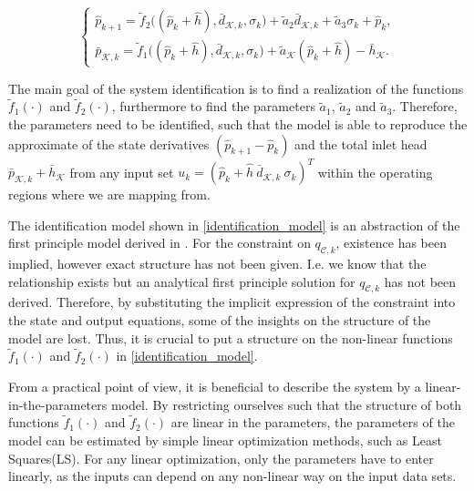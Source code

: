 \begin{equation}
\begin{cases}
  \label{identification_model}
    \hat{p}_{k+1}  = \tilde{f}_2 \big((\hat{p}_k + \hat{h}),\bar{d}_{\mathcal{K},k}, \sigma_k\big) + \tilde{a}_2 \bar{d}_{\mathcal{K},k} + \tilde{a}_3 \sigma_k + \hat{p}_k,\\
  \bar{p}_{\mathcal{K},k}  = \tilde{f}_1 \big((\hat{p}_k + \hat{h}),\bar{d}_{\mathcal{K},k}, \sigma_k\big) + \tilde{a}_{\mathcal{K}} (\hat{p}_k + \hat{h}) - \bar{h}_{\mathcal{K}}.
  \end{cases}
\end{equation} 

The main goal of the system identification is to find a realization of the functions $\tilde{f}_1(\cdot)$ and $\tilde{f}_2(\cdot)$, furthermore to find the parameters $\tilde{a}_1$, $\tilde{a}_2$ and $\tilde{a}_3$. Therefore, the parameters need to be identified, such that the model is able to reproduce the approximate of the state derivatives $(\hat{p}_{k+1} - \hat{p}_k)$ and the total inlet head $\bar{p}_{\mathcal{K},k} + \bar{h}_{\mathcal{K}}$ from any input set $u_k = ( \hat{p}_k\! + \!\hat{h} \ \bar{d}_{\mathcal{K},k} \ \sigma_k )^T$ within the operating regions where we are mapping from.

The identification model shown in \eqref{identification_model} is an abstraction of the first principle model derived in . For the constraint on $q_{\mathcal{C},k}$, existence has been implied, however exact structure has not been given. I.e. we know that the relationship exists but an analytical first principle solution for $q_{\mathcal{C},k}$ has not been derived. Therefore, by substituting the implicit expression of the constraint into the state and output equations, some of the insights on the structure of the model are lost. Thus, it is crucial to put a structure on the non-linear functions $\tilde{f}_1(\cdot)$ and $\tilde{f}_2(\cdot)$ in \eqref{identification_model}. 

From a practical point of view, it is beneficial to describe the system by a linear-in-the-parameters model. By restricting ourselves such that the structure of both functions $\tilde{f}_1(\cdot)$ and $\tilde{f}_2(\cdot)$ are linear in the parameters, the parameters of the model can be estimated by simple linear optimization methods, such as Least Squares(LS). For any linear optimization, only the parameters have to enter linearly, as the inputs can depend on any non-linear way on the input data sets. 

